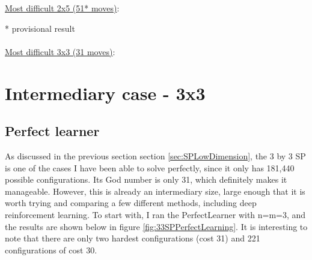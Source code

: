 \begin{center}
\begin{seven}
\end{seven}
\end{center}
\underline{Most difficult 2x5 (51* moves)}:
\begin{center}
\begin{nine}
\end{nine}
\end{center}
* provisional result
\\
\\
\underline{Most difficult 3x3 (31 moves)}:
\begin{center}
\begin{eight}
\end{eight}
\end{center}



\section{Intermediary case - 3x3}
\label{sec:S33}


\subsection{Perfect learner}
As discussed in the previous section section \ref{sec:SPLowDimension}, the 3 by 3 SP is one of the cases I have been able to solve perfectly, since it only has 181,440 possible configurations. Its God number is only 31, which definitely makes it manageable. However, this is already an intermediary size, large enough that it is worth trying and comparing a few different methods, including deep reinforcement learning. To start with, I ran the PerfectLearner with n=m=3, and the results are shown below in figure \ref{fig:33SPPerfectLearning}. It is interesting to note that there are only two hardest configurations (cost 31) and 221 configurations of cost 30.


